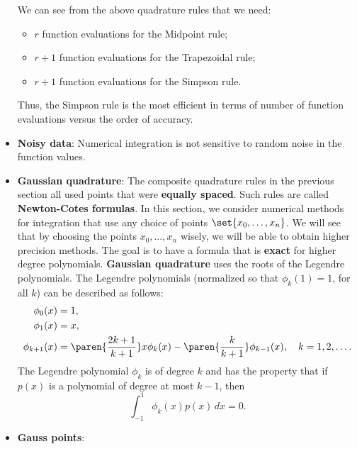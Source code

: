 \documentclass{report}
\begin{document}
\begin{itemize}
            \bigbreak \noindent 
            We can see from the above quadrature rules that we need:
            \begin{itemize}
                \item $r$ function evaluations for the Midpoint rule;
                \item $r + 1$ function evaluations for the Trapezoidal rule;
                \item $r + 1$ function evaluations for the Simpson rule.
            \end{itemize}
            \bigbreak \noindent 
            Thus, the Simpson rule is the most efficient in terms of number of function evaluations versus the order of accuracy.
        \item \textbf{Noisy data}: Numerical integration is not sensitive to random noise in the function values.
        \item \textbf{Gaussian quadrature}:
            The composite quadrature rules in the previous section all used points that were \textbf{equally spaced}. Such rules are called \textbf{Newton-Cotes formulas}.
            \bigbreak \noindent 
            In this section, we consider numerical methods for integration that use any choice of points $\set{x_0,\ldots,x_n}$.
            \bigbreak \noindent 
            We will see that by choosing the points $x_0,\ldots,x_n$ wisely, we will be able to obtain higher precision methods.
            \bigbreak \noindent 
            The goal is to have a formula that is \textbf{exact} for higher degree polynomials.
            \bigbreak \noindent 
            \textbf{Gaussian quadrature} uses the roots of the Legendre polynomials.
            \bigbreak \noindent 
            The Legendre polynomials (normalized so that $\phi_k(1) = 1$, for all $k$) can be described as follows:
            \begin{align*}
                \phi_0(x) &= 1,\\
                \phi_1(x) &= x,\\
                \phi_{k+1}(x) &= \paren{\frac{2k+1}{k+1}} x \phi_k(x) - \paren{\frac{k}{k+1}} \phi_{k-1}(x), \quad k = 1,2,\ldots.\\
            \end{align*}
            \bigbreak \noindent 
            The Legendre polynomial $\phi_k$ is of degree $k$ and has the property that if $p(x)$ is a polynomial of degree at most $k-1$, then
            $$\int_{-1}^1 \phi_k(x) p(x)\, dx = 0.$$
        \item \textbf{Gauss points}:

\end{itemize}
\end{document}
